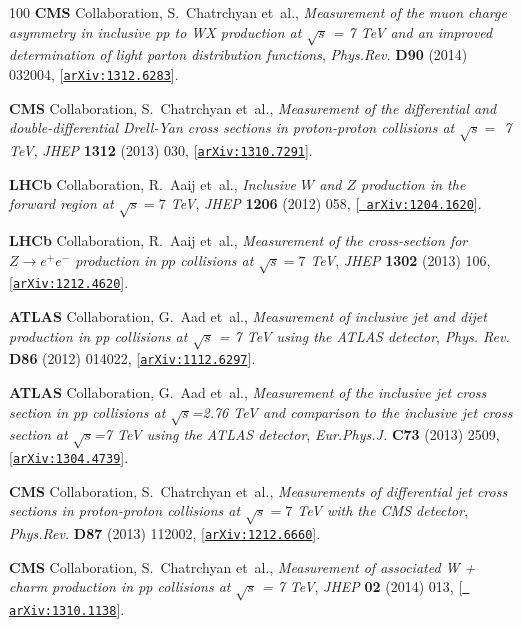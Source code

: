 \begin{thebibliography}{100}
{\bf CMS} Collaboration, S.~Chatrchyan et~al., {\it {Measurement of the muon
  charge asymmetry in inclusive pp to WX production at $\sqrt{s}$ = 7 TeV and
  an improved determination of light parton distribution functions}},  {\em
  Phys.Rev.} {\bf D90} (2014) 032004,
  [\href{http://arxiv.org/abs/1312.6283}{{\tt arXiv:1312.6283}}].

{\bf CMS} Collaboration, S.~Chatrchyan et~al., {\it {Measurement of the
  differential and double-differential Drell-Yan cross sections in
  proton-proton collisions at $\sqrt{s} =$ 7 TeV}},  {\em JHEP} {\bf 1312}
  (2013) 030, [\href{http://arxiv.org/abs/1310.7291}{{\tt arXiv:1310.7291}}].

{\bf LHCb} Collaboration, R.~Aaij et~al., {\it {Inclusive $W$ and $Z$
  production in the forward region at $\sqrt{s} = 7$ TeV}},  {\em JHEP} {\bf
  1206} (2012) 058, [\href{http://arxiv.org/abs/1204.1620}{{\tt
  arXiv:1204.1620}}].

{\bf LHCb} Collaboration, R.~Aaij et~al., {\it {Measurement of the
  cross-section for $Z \to e^+e^-$ production in $pp$ collisions at
  $\sqrt{s}=7$ TeV}},  {\em JHEP} {\bf 1302} (2013) 106,
  [\href{http://arxiv.org/abs/1212.4620}{{\tt arXiv:1212.4620}}].

{\bf ATLAS} Collaboration, G.~Aad et~al., {\it {Measurement of inclusive jet
  and dijet production in pp collisions at $\sqrt{s}$ = 7 TeV using the ATLAS
  detector}},  {\em Phys. Rev.} {\bf D86} (2012) 014022,
  [\href{http://arxiv.org/abs/1112.6297}{{\tt arXiv:1112.6297}}].

{\bf ATLAS} Collaboration, G.~Aad et~al., {\it {Measurement of the inclusive
  jet cross section in pp collisions at $\sqrt{s}$=2.76 TeV and comparison to
  the inclusive jet cross section at $\sqrt{s}$=7 TeV using the ATLAS
  detector}},  {\em Eur.Phys.J.} {\bf C73} (2013) 2509,
  [\href{http://arxiv.org/abs/1304.4739}{{\tt arXiv:1304.4739}}].

{\bf CMS} Collaboration, S.~Chatrchyan et~al., {\it {Measurements of
  differential jet cross sections in proton-proton collisions at $\sqrt{s}=7$
  TeV with the CMS detector}},  {\em Phys.Rev.} {\bf D87} (2013) 112002,
  [\href{http://arxiv.org/abs/1212.6660}{{\tt arXiv:1212.6660}}].

{\bf CMS} Collaboration, S.~Chatrchyan et~al., {\it {Measurement of associated
  W + charm production in pp collisions at $\sqrt{s}$ = 7 TeV}},  {\em JHEP}
  {\bf 02} (2014) 013, [\href{http://arxiv.org/abs/1310.1138}{{\tt
  arXiv:1310.1138}}].


\end{thebibliography}
